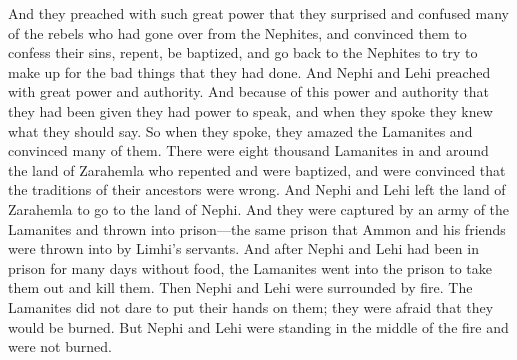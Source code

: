 And they preached with such great power that they surprised and confused many of the rebels who had gone over from the Nephites, and convinced them to confess their sins, repent, be baptized, and go back to the Nephites to try to make up for the bad things that they had done.
\bverse \iffalse And it came to pass that Nephi and Lehi did preach unto the Lamanites with such great power and authority, for they had power and authority, given unto them that they might speak, and they also had what they should speak given unto them-- \fi
And Nephi and Lehi preached with great power and authority. And because of this power and authority that they had been given they had power to speak, and when they spoke they knew what they should say.
\bverse \iffalse Therefore they did speak unto the great astonishment of the Lamanites, to the convincing them, insomuch that there were eight thousand of the Lamanites who were in the land of Zarahemla and round about baptized unto repentance, and were convinced of the wickedness of the traditions of their fathers. \fi
So when they spoke, they amazed the Lamanites and convinced many of them. There were eight thousand Lamanites in and around the land of Zarahemla who repented and were baptized, and were convinced that the traditions of their ancestors were wrong.
\bverse \iffalse And it came to pass that Nephi and Lehi did proceed from thence to go to the land of Nephi. \fi
And Nephi and Lehi left the land of Zarahemla to go to the land of Nephi.
\bverse \iffalse And it came to pass that they were taken by an army of the Lamanites and cast into prison; yea, even in that same prison in which Ammon and his brethren were cast by the servants of Limhi. \fi
And they were captured by an army of the Lamanites and thrown into prison---the same prison that Ammon and his friends were thrown into by Limhi's servants.
\bverse \iffalse And after they had been cast into prison many days without food, behold, they went forth into the prison to take them that they might slay them. \fi
And after Nephi and Lehi had been in prison for many days without food, the Lamanites went into the prison to take them out and kill them.
\bverse \iffalse And it came to pass that Nephi and Lehi were encircled about as if by fire, even insomuch that they durst not lay their hands upon them for fear lest they should be burned. Nevertheless, Nephi and Lehi were not burned; and they were as standing in the midst of fire and were not burned. \fi
Then Nephi and Lehi were surrounded by fire. The Lamanites did not dare to put their hands on them; they were afraid that they would be burned. But Nephi and Lehi were standing in the middle of the fire and were not burned.
